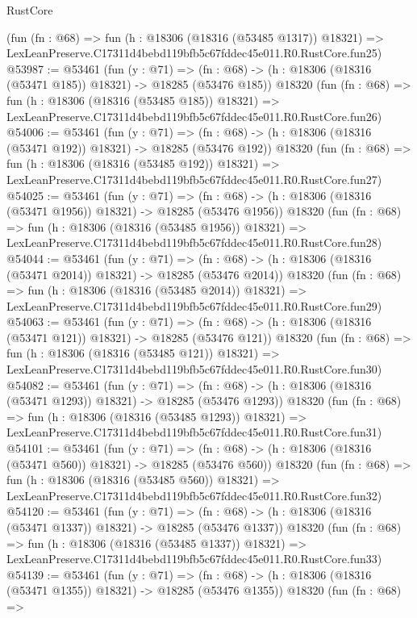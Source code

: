 \begin{lexlean}{RustCore}
\begin{coremodule}
    (fun (fn : @68) =>
    fun (h : @18306 (@18316 (@53485 @1317)) @18321) =>
    LexLeanPreserve.C17311d4bebd119bfb5c67fddec45e011.R0.RustCore.fun25)
@53987 := @53461
    (fun (y : @71) =>
    (fn : @68) -> (h : @18306 (@18316 (@53471 @185)) @18321) -> @18285 (@53476 @185))
    @18320
    (fun (fn : @68) =>
    fun (h : @18306 (@18316 (@53485 @185)) @18321) =>
    LexLeanPreserve.C17311d4bebd119bfb5c67fddec45e011.R0.RustCore.fun26)
@54006 := @53461
    (fun (y : @71) =>
    (fn : @68) -> (h : @18306 (@18316 (@53471 @192)) @18321) -> @18285 (@53476 @192))
    @18320
    (fun (fn : @68) =>
    fun (h : @18306 (@18316 (@53485 @192)) @18321) =>
    LexLeanPreserve.C17311d4bebd119bfb5c67fddec45e011.R0.RustCore.fun27)
@54025 := @53461
    (fun (y : @71) =>
    (fn : @68) -> (h : @18306 (@18316 (@53471 @1956)) @18321) -> @18285 (@53476 @1956))
    @18320
    (fun (fn : @68) =>
    fun (h : @18306 (@18316 (@53485 @1956)) @18321) =>
    LexLeanPreserve.C17311d4bebd119bfb5c67fddec45e011.R0.RustCore.fun28)
@54044 := @53461
    (fun (y : @71) =>
    (fn : @68) -> (h : @18306 (@18316 (@53471 @2014)) @18321) -> @18285 (@53476 @2014))
    @18320
    (fun (fn : @68) =>
    fun (h : @18306 (@18316 (@53485 @2014)) @18321) =>
    LexLeanPreserve.C17311d4bebd119bfb5c67fddec45e011.R0.RustCore.fun29)
@54063 := @53461
    (fun (y : @71) =>
    (fn : @68) -> (h : @18306 (@18316 (@53471 @121)) @18321) -> @18285 (@53476 @121))
    @18320
    (fun (fn : @68) =>
    fun (h : @18306 (@18316 (@53485 @121)) @18321) =>
    LexLeanPreserve.C17311d4bebd119bfb5c67fddec45e011.R0.RustCore.fun30)
@54082 := @53461
    (fun (y : @71) =>
    (fn : @68) -> (h : @18306 (@18316 (@53471 @1293)) @18321) -> @18285 (@53476 @1293))
    @18320
    (fun (fn : @68) =>
    fun (h : @18306 (@18316 (@53485 @1293)) @18321) =>
    LexLeanPreserve.C17311d4bebd119bfb5c67fddec45e011.R0.RustCore.fun31)
@54101 := @53461
    (fun (y : @71) =>
    (fn : @68) -> (h : @18306 (@18316 (@53471 @560)) @18321) -> @18285 (@53476 @560))
    @18320
    (fun (fn : @68) =>
    fun (h : @18306 (@18316 (@53485 @560)) @18321) =>
    LexLeanPreserve.C17311d4bebd119bfb5c67fddec45e011.R0.RustCore.fun32)
@54120 := @53461
    (fun (y : @71) =>
    (fn : @68) -> (h : @18306 (@18316 (@53471 @1337)) @18321) -> @18285 (@53476 @1337))
    @18320
    (fun (fn : @68) =>
    fun (h : @18306 (@18316 (@53485 @1337)) @18321) =>
    LexLeanPreserve.C17311d4bebd119bfb5c67fddec45e011.R0.RustCore.fun33)
@54139 := @53461
    (fun (y : @71) =>
    (fn : @68) -> (h : @18306 (@18316 (@53471 @1355)) @18321) -> @18285 (@53476 @1355))
    @18320
    (fun (fn : @68) =>

\end{coremodule}
\end{lexlean}
